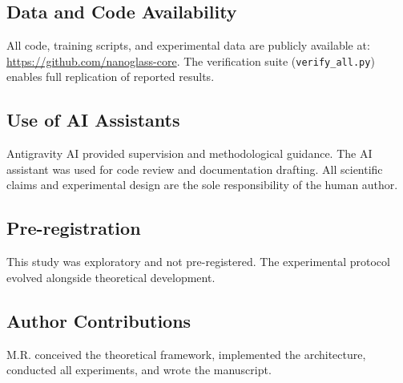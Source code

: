 \documentclass[12pt, a4paper]{article}
\begin{document}
\subsection*{Data and Code Availability}
All code, training scripts, and experimental data are publicly available at: \url{https://github.com/nanoglass-core}. The verification suite (\texttt{verify\_all.py}) enables full replication of reported results.

\subsection*{Use of AI Assistants}
Antigravity AI provided supervision and methodological guidance. The AI assistant was used for code review and documentation drafting. All scientific claims and experimental design are the sole responsibility of the human author.

\subsection*{Pre-registration}
This study was exploratory and not pre-registered. The experimental protocol evolved alongside theoretical development.

\subsection*{Author Contributions}
M.R. conceived the theoretical framework, implemented the architecture, conducted all experiments, and wrote the manuscript.

\printbibliography
\end{document}
